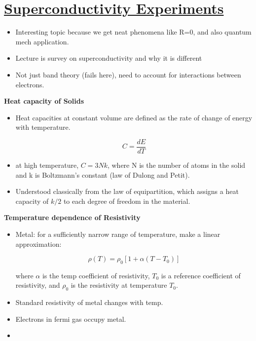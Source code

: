 \section[Superconductivity Experiments]{\hyperlink{toc}{Superconductivity Experiments}}

\begin{itemize}
    \item Interesting topic because we get neat phenomena like R=0, and also quantum mech application.
    \item Lecture is survey on superconductivity and why it is different 
    \item Not just band theory (fails here), need to account for interactions between electrons.
\end{itemize}

\textbf{Heat capacity of Solids}

\begin{itemize}
    \item Heat capacities at constant volume are defined as the rate of change of energy with temperature.

    \[ C = \frac{dE}{dT}\]

    \item at high temperature, $C=3Nk$, where N is the number of atoms in the solid and k is Boltzmann's constant (law of Dulong and Petit).

    \item Understood classically from the law of equipartition, which assigns a heat capacity of $k/2$ to each degree of freedom in the material.
\end{itemize}

\textbf{Temperature dependence of Resistivity}

\begin{itemize}
    \item Metal: for a sufficiently narrow range of temperature, make a linear approximation:

    \[ \rho(T) = \rho_0 [1+\alpha(T-T_0)]\]

    where $\alpha$ is the temp coefficient of resistivity, $T_0$ is a reference coefficient of resistivity, and $\rho_0$ is the resistivity at temperature $T_0$. 

    \item Standard resistivity of metal changes with temp. 
    
    \item Electrons in fermi gas occupy metal.

    \item 
\end{itemize}
